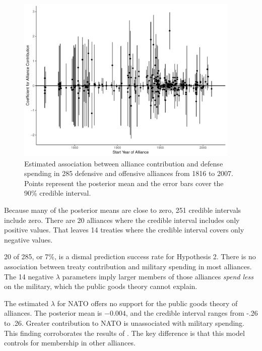\documentclass[12pt]{article}
\begin{document}
\begin{figure}[htbp]
	\centering
		\includegraphics[width=0.95\textwidth]{alliance-coefs-year.pdf}
	\caption{Estimated association between alliance contribution and defense spending in 285 defensive and offensive alliances from 1816 to 2007. Points represent the posterior mean and the error bars cover the 90\% credible interval.}
	\label{fig:alliance-coefs-year}
\end{figure}


Because many of the posterior means are close to zero, 251 credible intervals include zero. 
There are 20 alliances where the credible interval includes only positive values. 
That leaves 14 treaties where the credible interval covers only negative values. 


20 of 285, or 7\%, is a dismal prediction success rate for Hypothesis 2. 
There is no association between treaty contribution and military spending in most alliances.
The 14 negative $\lambda$ parameters imply larger members of those alliances \emph{spend less} on the military, which the public goods theory cannot explain. 


The estimated $\lambda$ for NATO offers no support for the public goods theory of alliances. 
The posterior mean is $-0.004$, and the credible interval ranges from -.26 to .26.  
Greater contribution to NATO is unassociated with military spending. 
This finding corroborates the results of \citet{PluemperNeumayer2015}. 
The key difference is that this model controls for membership in other alliances. 


\end{document}
